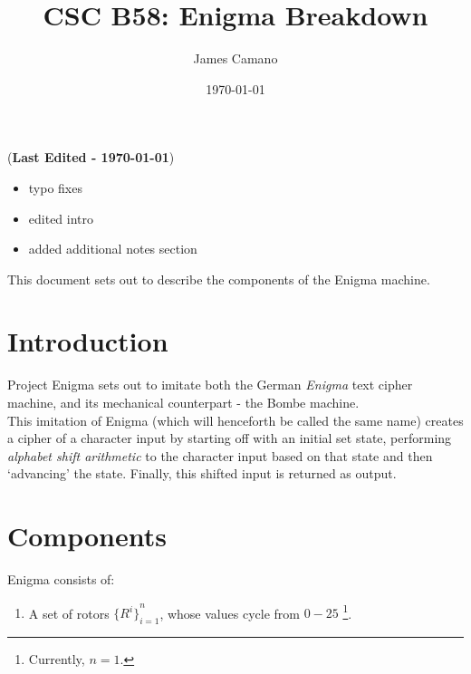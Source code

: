 \documentclass[12pt,a4paper]{article}
\title{CSC B58: Enigma Breakdown}
\date{\today}
\author{James Camano}
\newcommand{\lastedited}{(\textbf{Last Edited - \today{}})}
\begin{document}
	\maketitle
	\lastedited
	\begin{itemize}
		\item typo fixes
		\item edited intro 
		\item added additional notes section
	\end{itemize}

	This document sets out to describe the components of the Enigma machine. \\
	\section{Introduction}
 	Project Enigma sets out to imitate both the German \emph{Enigma} text cipher machine, and its mechanical counterpart - the Bombe machine.  \\

	This imitation of Enigma (which will henceforth be called the same name) creates a cipher of a character input by starting off with an initial set state, performing \emph{alphabet shift arithmetic} to the character input based on that state and then `advancing' the state. Finally, this shifted input is returned as output.
	
	\section{Components}
	Enigma consists of:

	\begin{enumerate}
		\item A set of rotors ${\{R^i\}}_{i=1}^{n}$, whose values cycle from $0-25$ \footnote{Currently, $n=1$. }. 
	\end{enumerate}
\end{document}
